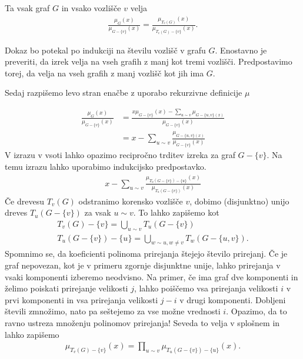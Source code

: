\begin{lema}
    Ta vsak graf \(G\) in vsako vozlišče \(v\) velja
    \begin{align*}
        \frac{\mu_G(x)}{\mu_{G-\{v\}}(x)} = \frac{\mu_{T_v(G)}(x)}{\mu_{T_v(G)-\{v\}}(x)}.
    \end{align*}
\end{lema}
\begin{dokaz}
    Dokaz bo potekal po indukciji na številu vozlišč v grafu \(G\). Enostavno je preveriti, da izrek velja na vseh grafih z manj kot tremi vozlišči. Predpostavimo torej, da velja na vseh grafih z manj vozlišč kot jih ima \(G\).

    Sedaj razpišemo levo stran enačbe z uporabo rekurzivne definicije \(\mu\)

    \begin{align*}
        \frac{\mu_G(x)}{\mu_{G-\{v\}}(x)} &= \frac{x \mu_{G-\{v\}}(x) - \sum_{u\sim v}\mu_{G-\{u, v\}(x)}}{\mu_{G-\{v\}}(x)}\\
        &= x - \sum_{u\sim v}\frac{\mu_{G-\{u, v\}(x)}}{\mu_{G-\{v\}}(x)}
    \end{align*}
    V izrazu v vsoti lahko opazimo recipročno trditev izreka za graf \(G-\{v\}\). Na temu izrazu lahko uporabimo indukcijsko predpostavko.
    \begin{align}\label{lemamatching}
        x - \sum_{u\sim v}\frac{\mu_{T_u(G-\{v\}) - \{u\}}(x)}{\mu_{T_u(G-\{v\})}(x)}
    \end{align}
    Če drevesu \(T_v(G)\) odstranimo korensko vozlišče \(v\), dobimo (disjunktno) unijo dreves \(T_u(G-\{v\})\) za vsak \(u\sim v\). To lahko zapišemo kot
    \begin{align*}
        T_v(G) - \{v\} = \bigcup_{u\sim v} T_u(G-\{v\}) \\
        T_u(G - \{v\}) - \{u\} = \bigcup_{w\sim u, w\neq v} T_w(G-\{u, v\}).
    \end{align*}
    Spomnimo se, da koeficienti polinoma prirejanja štejejo število prirejanj. Če je graf nepovezan, kot je v primeru zgornje disjunktne unije, lahko prirejanja v vsaki komponenti izberemo neodvisno. Na primer, če ima graf dve komponenti in želimo poiskati prirejanje velikosti \(j\), lahko poiščemo vsa prirejanja velikosti \(i\) v prvi komponenti in vsa prirejanja velikosti \(j-i\) v drugi komponenti. Dobljeni števili zmnožimo, nato pa seštejemo za vse možne vrednosti \(i\). Opazimo, da to ravno ustreza množenju polinomov prirejanja! Seveda to velja v splošnem in lahko zapišemo
    \begin{align*}
        \mu_{T_v(G) - \{v\}}(x) = \prod_{u\sim v} \mu_{T_u(G-\{v\}) - \{u\}}(x).
    \end{align*}


\end{dokaz}
